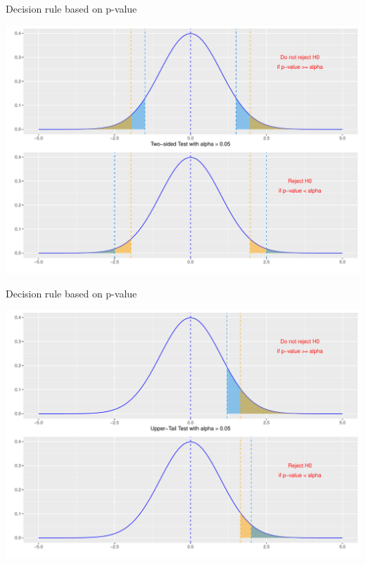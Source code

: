 \documentclass[
  10pt,
  ignorenonframetext,
]{beamer}
\begin{document}
\begin{frame}{Decision rule based on p-value}
\protect\hypertarget{decision-rule-based-on-p-value}{}
\begin{center}\includegraphics[width=1\linewidth]{ECON1013_Tutorial-4-_files/figure-beamer/unnamed-chunk-3-1} \end{center}
\end{frame}

\begin{frame}{Decision rule based on p-value}
\protect\hypertarget{decision-rule-based-on-p-value-1}{}
\begin{center}\includegraphics[width=1\linewidth]{ECON1013_Tutorial-4-_files/figure-beamer/unnamed-chunk-4-1} \end{center}
\end{frame}
\end{document}

